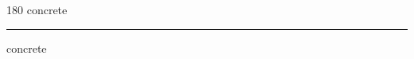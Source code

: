 
\begin{frame}
\begin{center}
\begin{turn}{180}
{\fontsize{2.5cm}{1em}\selectfont concrete}
\end{turn}
\vspace{1em}\par  
\hrule
\vspace{1em}\par  
{\fontsize{2.5cm}{1em}\selectfont concrete}
\end{center}
\end{frame}
